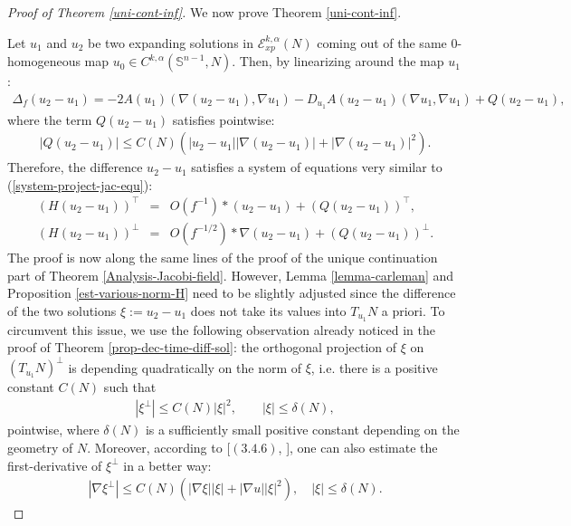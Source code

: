 \documentclass[a4paper,11pt,reqno]{amsart}
\newcommand{\Ent}{\mathcal{E}}
\begin{document}
\begin{proof}[Proof of Theorem \ref{uni-cont-inf}]
We now prove Theorem \ref{uni-cont-inf}. 

Let $u_1$ and $u_2$ be two expanding solutions in $\Ent_{xp}^{k,\alpha}(N)$ coming out of the same $0$-homogeneous map $u_0\in C^{k,\alpha}(\mathbb{S}^{n-1},N)$. Then, by linearizing around the map $u_1$:
\begin{eqnarray*}
\Delta_f(u_2-u_1)=-2A(u_1)(\nabla(u_2-u_1),\nabla u_1)-D_{u_1}A(u_2-u_1)(\nabla u_1,\nabla u_1)+ Q(u_2-u_1),
\end{eqnarray*}
where the term $Q(u_2-u_1)$ satisfies pointwise:
\begin{eqnarray*}
|Q(u_2-u_1)|\leq C(N)\left(|u_2-u_1||\nabla(u_2-u_1)|+|\nabla(u_2-u_1)|^2\right).
\end{eqnarray*}
Therefore, the difference $u_2-u_1$ satisfies a system of equations very similar to (\ref{system-project-jac-equ}):
\begin{eqnarray}
(H(u_2-u_1))^{\top}&=&\textit{O}(f^{-1})\ast (u_2-u_1)+(Q(u_2-u_1))^{\top},\label{system-project-nonlin-equ-1}\\
 (H(u_2-u_1))^{\perp}&=&\textit{O}(f^{-1/2})\ast\nabla(u_2-u_1)+(Q(u_2-u_1))^{\perp}.\label{system-project-nonlin-equ-2}
\end{eqnarray}
The proof is now along the same lines of the proof of the unique continuation part of Theorem \ref{Analysis-Jacobi-field}. 
However, Lemma \ref{lemma-carleman} and Proposition \ref{est-various-norm-H} need to be slightly adjusted since the difference of the two solutions $\xi:=u_2-u_1$ does not take its values into $T_{u_1}N$  a priori. To circumvent this issue, we use the following observation already noticed in the proof of Theorem \ref{prop-dec-time-diff-sol}: the orthogonal projection of $\xi$ on $(T_{u_1}N)^{\perp}$ is depending quadratically on the norm of $\xi$, i.e. there is a positive constant $C(N)$ such that 
\begin{eqnarray}
|\xi^{\perp}|\leq C(N)|\xi|^2,\quad \quad |\xi|\leq \delta(N), \label{pt-better-est-perp-part}
\end{eqnarray}
pointwise, where $\delta(N)$ is a sufficiently small positive constant depending on the geometry of $N$. Moreover, according to [$(3.4.6)$, \cite{Har-Mou}], one can also estimate the first-derivative of $\xi^{\perp}$ in a better way:
\begin{eqnarray}
|\nabla \xi^{\perp}|\leq C(N)\left(|\nabla \xi||\xi|+|\nabla u||\xi|^2\right),\quad |\xi|\leq \delta(N).\label{pt-better-est-grad-perp-part}
\end{eqnarray}



\end{proof}
\end{document}
